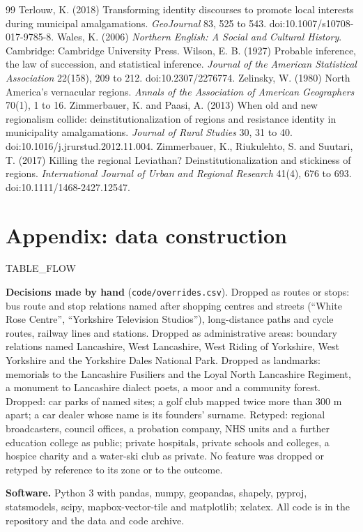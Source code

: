 \documentclass[11pt,a4paper]{article}
\begin{document}
\begin{thebibliography}{99}
 Terlouw, K. (2018) Transforming identity discourses to promote local interests during municipal amalgamations. \textit{GeoJournal} 83, 525 to 543. doi:10.1007/s10708-017-9785-8.
 Wales, K. (2006) \textit{Northern English: A Social and Cultural History}. Cambridge: Cambridge University Press.
 Wilson, E. B. (1927) Probable inference, the law of succession, and statistical inference. \textit{Journal of the American Statistical Association} 22(158), 209 to 212. doi:10.2307/2276774.
 Zelinsky, W. (1980) North America's vernacular regions. \textit{Annals of the Association of American Geographers} 70(1), 1 to 16.
 Zimmerbauer, K. and Paasi, A. (2013) When old and new regionalism collide: deinstitutionalization of regions and resistance identity in municipality amalgamations. \textit{Journal of Rural Studies} 30, 31 to 40. doi:10.1016/j.jrurstud.2012.11.004.
 Zimmerbauer, K., Riukulehto, S. and Suutari, T. (2017) Killing the regional Leviathan? Deinstitutionalization and stickiness of regions. \textit{International Journal of Urban and Regional Research} 41(4), 676 to 693. doi:10.1111/1468-2427.12547.
\end{thebibliography}

\appendix
\section{Appendix: data construction}
{{TABLE_FLOW}}

\textbf{Decisions made by hand} (\texttt{code/overrides.csv}). Dropped as routes or stops: bus route and stop relations named after shopping centres and streets (``White Rose Centre'', ``Yorkshire Television Studios''), long-distance paths and cycle routes, railway lines and stations. Dropped as administrative areas: boundary relations named Lancashire, West Lancashire, West Riding of Yorkshire, West Yorkshire and the Yorkshire Dales National Park. Dropped as landmarks: memorials to the Lancashire Fusiliers and the Loyal North Lancashire Regiment, a monument to Lancashire dialect poets, a moor and a community forest. Dropped: car parks of named sites; a golf club mapped twice more than 300 m apart; a car dealer whose name is its founders' surname. Retyped: regional broadcasters, council offices, a probation company, NHS units and a further education college as public; private hospitals, private schools and colleges, a hospice charity and a water-ski club as private. No feature was dropped or retyped by reference to its zone or to the outcome.

\textbf{Software.} Python 3 with pandas, numpy, geopandas, shapely, pyproj, statsmodels, scipy, mapbox-vector-tile and matplotlib; xelatex. All code is in the repository and the data and code archive.
\end{document}
